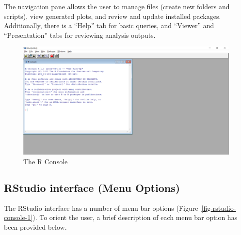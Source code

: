 \documentclass[
  letterpaper,
  DIV=11,
  numbers=noendperiod]{scrreprt}
\begin{document}
The navigation pane allows the user to manage files (create new folders
and scripts), view generated plots, and review and update installed
packages. Additionally, there is a ``Help'' tab for basic queries, and
``Viewer'' and ``Presentation'' tabs for reviewing analysis outputs.

\begin{figure}[H]

{\centering \includegraphics{images/navigating/r_console_1.png}

}

\caption{The R Console}

\end{figure}%

\subsection{RStudio interface (Menu
Options)}\label{rstudio-interface-menu-options}

The RStudio interface has a number of menu bar options
(Figure~\ref{fig-rstudio-console-1}). To orient the user, a brief
description of each menu bar option has been provided below.
\end{document}
